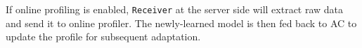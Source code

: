 If online profiling is enabled, \texttt{Receiver} at the server side will
extract raw data and send it to online profiler. The newly-learned model is then
fed back to AC to update the profile for subsequent adaptation.

%     

